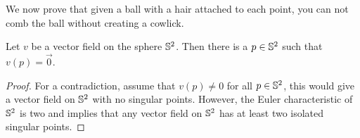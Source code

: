 We now prove that given a ball with a hair attached to each point, you can not
comb the ball without creating a cowlick.

\begin{theorem}\label{thm:harry-ball}
	Let $v$ be a vector field on the sphere $\mathbb{S}^2$.
	Then there is a $p\in \mathbb{S}^2$ such that $v(p)=\vec{0}$.
\end{theorem}

\begin{proof}
	For a contradiction, assume that $v(p)\neq 0$ for all  $p\in \mathbb{S}^2$,
	this would give a vector field on $\mathbb{S}^2$ with no singular points.
	However, the Euler characteristic of $\mathbb{S}^2$ is two and
	 implies that any vector field on $\mathbb{S}^2$ has at
	least two isolated singular points.
	
\end{proof} 
\cite{rotskoff2010}
